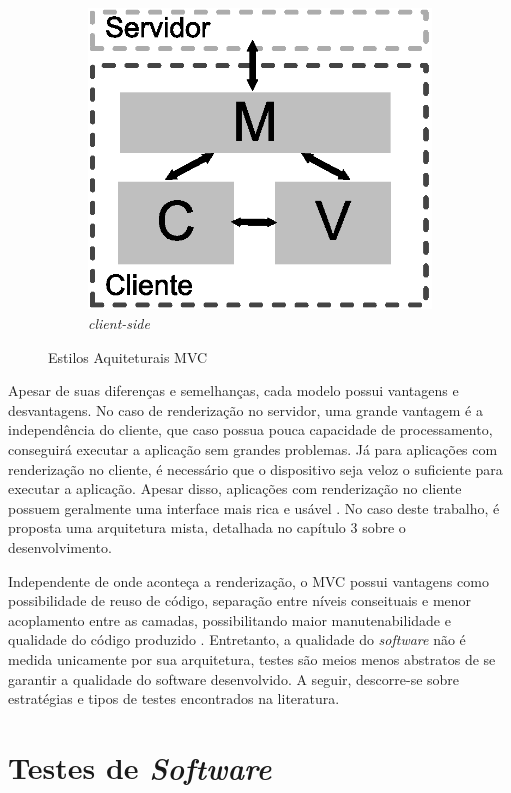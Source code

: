 \begin{figure}[h!]
\begin{subfigure}{.31\textwidth}
  		\centering
  		\includegraphics[width=.9\linewidth]{figuras/cliente.eps}
  		\caption{ \textit{client-side}}
  		\label{fig:submvc3}
	\end{subfigure}
	\caption{Estilos Aquiteturais MVC}
	\label{fig:mvc}
\end{figure}

Apesar de suas diferenças e semelhanças, cada modelo possui vantagens e desvantagens. No caso de renderização no servidor, uma grande vantagem é a independência do cliente, que caso possua pouca capacidade de processamento, conseguirá executar a aplicação sem grandes problemas. Já para aplicações com renderização no cliente, é necessário que o dispositivo seja veloz o suficiente para executar a aplicação. Apesar disso, aplicações com renderização no cliente possuem geralmente uma interface mais rica e usável \cite{Ubl2015}. No caso deste trabalho, é proposta uma arquitetura mista, detalhada no capítulo 3 sobre o desenvolvimento.

Independente de onde aconteça a renderização, o MVC possui vantagens como possibilidade de reuso de código, separação entre níveis conseituais e menor acoplamento entre as camadas, possibilitando maior manutenabilidade e qualidade do código produzido \cite{krasner1988}. Entretanto, a qualidade do \textit{software} não é medida unicamente por sua arquitetura, testes são meios menos abstratos de se garantir a qualidade do software desenvolvido. A seguir, descorre-se sobre estratégias e tipos de testes encontrados na literatura.

\section{Testes de \textit{Software}}

